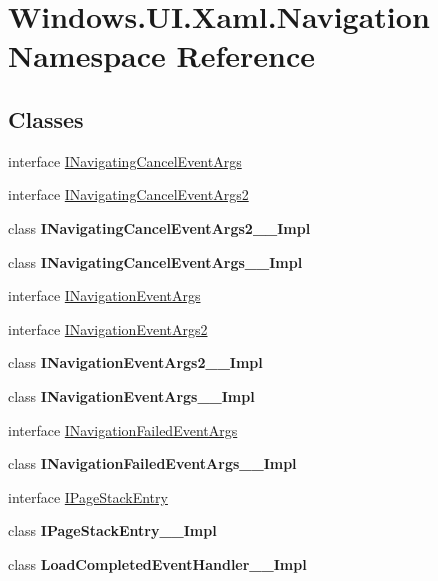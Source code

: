 \hypertarget{namespace_windows_1_1_u_i_1_1_xaml_1_1_navigation}{}\section{Windows.\+U\+I.\+Xaml.\+Navigation Namespace Reference}
\label{namespace_windows_1_1_u_i_1_1_xaml_1_1_navigation}
\subsection*{Classes}
\begin{DoxyCompactItemize}
\item 
interface \hyperlink{interface_windows_1_1_u_i_1_1_xaml_1_1_navigation_1_1_i_navigating_cancel_event_args}{I\+Navigating\+Cancel\+Event\+Args}
\item 
interface \hyperlink{interface_windows_1_1_u_i_1_1_xaml_1_1_navigation_1_1_i_navigating_cancel_event_args2}{I\+Navigating\+Cancel\+Event\+Args2}
\item 
class {\bfseries I\+Navigating\+Cancel\+Event\+Args2\+\_\+\+\_\+\+Impl}
\item 
class {\bfseries I\+Navigating\+Cancel\+Event\+Args\+\_\+\+\_\+\+Impl}
\item 
interface \hyperlink{interface_windows_1_1_u_i_1_1_xaml_1_1_navigation_1_1_i_navigation_event_args}{I\+Navigation\+Event\+Args}
\item 
interface \hyperlink{interface_windows_1_1_u_i_1_1_xaml_1_1_navigation_1_1_i_navigation_event_args2}{I\+Navigation\+Event\+Args2}
\item 
class {\bfseries I\+Navigation\+Event\+Args2\+\_\+\+\_\+\+Impl}
\item 
class {\bfseries I\+Navigation\+Event\+Args\+\_\+\+\_\+\+Impl}
\item 
interface \hyperlink{interface_windows_1_1_u_i_1_1_xaml_1_1_navigation_1_1_i_navigation_failed_event_args}{I\+Navigation\+Failed\+Event\+Args}
\item 
class {\bfseries I\+Navigation\+Failed\+Event\+Args\+\_\+\+\_\+\+Impl}
\item 
interface \hyperlink{interface_windows_1_1_u_i_1_1_xaml_1_1_navigation_1_1_i_page_stack_entry}{I\+Page\+Stack\+Entry}
\item 
class {\bfseries I\+Page\+Stack\+Entry\+\_\+\+\_\+\+Impl}
\item 
class {\bfseries Load\+Completed\+Event\+Handler\+\_\+\+\_\+\+Impl}
\item 

\end{DoxyCompactItemize}
